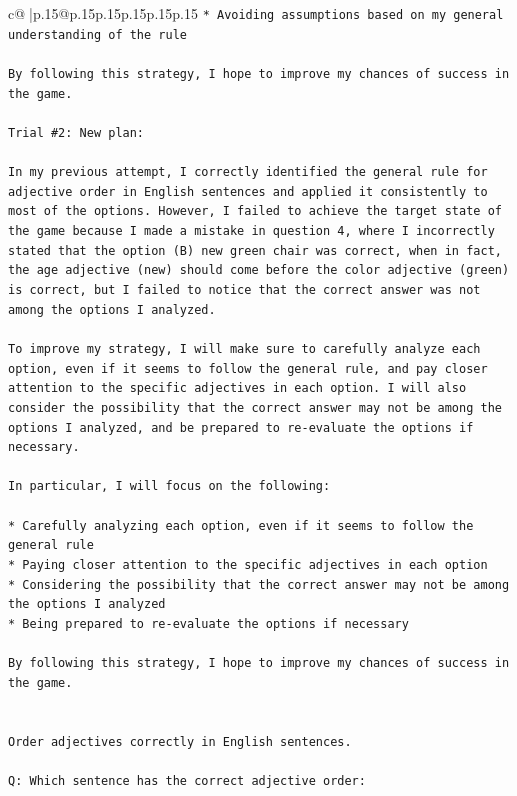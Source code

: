 \documentclass{article}
\begin{document}
{\begin{supertabular}{c@{$\;$}|p{.15\linewidth}@{}p{.15\linewidth}p{.15\linewidth}p{.15\linewidth}p{.15\linewidth}p{.15\linewidth}}
{{{\texttt{* Avoiding assumptions based on my general understanding of the rule} \\
\\ 
\texttt{By following this strategy, I hope to improve my chances of success in the game.} \\
\\ 
\texttt{Trial \#2: New plan: } \\
\\ 
\texttt{In my previous attempt, I correctly identified the general rule for adjective order in English sentences and applied it consistently to most of the options. However, I failed to achieve the target state of the game because I made a mistake in question 4, where I incorrectly stated that the option (B) new green chair was correct, when in fact, the age adjective (new) should come before the color adjective (green) is correct, but I failed to notice that the correct answer was not among the options I analyzed.} \\
\\ 
\texttt{To improve my strategy, I will make sure to carefully analyze each option, even if it seems to follow the general rule, and pay closer attention to the specific adjectives in each option. I will also consider the possibility that the correct answer may not be among the options I analyzed, and be prepared to re{-}evaluate the options if necessary.} \\
\\ 
\texttt{In particular, I will focus on the following:} \\
\\ 
\texttt{* Carefully analyzing each option, even if it seems to follow the general rule} \\
\texttt{* Paying closer attention to the specific adjectives in each option} \\
\texttt{* Considering the possibility that the correct answer may not be among the options I analyzed} \\
\texttt{* Being prepared to re{-}evaluate the options if necessary} \\
\\ 
\texttt{By following this strategy, I hope to improve my chances of success in the game.} \\
\\ 
\\ 
\texttt{Order adjectives correctly in English sentences.} \\
\\ 
\texttt{Q: Which sentence has the correct adjective order:} \\
}}}
\end{supertabular}}
\end{document}
